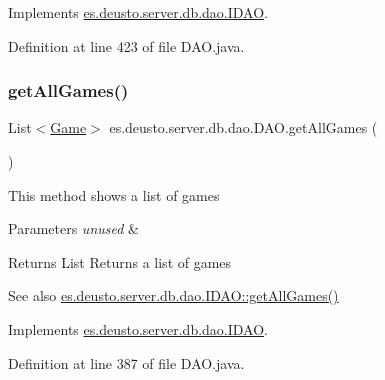 Implements \hyperlink{interfacees_1_1deusto_1_1server_1_1db_1_1dao_1_1_i_d_a_o_ad83c37658f356cb69c1fa70f99416579}{es.\+deusto.\+server.\+db.\+dao.\+I\+D\+AO}.



Definition at line 423 of file D\+A\+O.\+java.

\mbox{\label{classes_1_1deusto_1_1server_1_1db_1_1dao_1_1_d_a_o_af49ed57bdac4dec48ab7616602d12df2}} 
\subsubsection{\texorpdfstring{get\+All\+Games()}{getAllGames()}}
{\footnotesize\ttfamily List$<$\hyperlink{classes_1_1deusto_1_1server_1_1db_1_1data_1_1_game}{Game}$>$ es.\+deusto.\+server.\+db.\+dao.\+D\+A\+O.\+get\+All\+Games (\begin{DoxyParamCaption}{ }\end{DoxyParamCaption})}

This method shows a list of games 
\begin{DoxyParams}{Parameters}
{\em unused} & \\
\hline
\end{DoxyParams}
\begin{DoxyReturn}{Returns}
List Returns a list of games 
\end{DoxyReturn}
\begin{DoxySeeAlso}{See also}
\hyperlink{interfacees_1_1deusto_1_1server_1_1db_1_1dao_1_1_i_d_a_o_aebafef372cf3064b12d16fcb651b41ff}{es.\+deusto.\+server.\+db.\+dao.\+I\+D\+A\+O\+::get\+All\+Games()} 
\end{DoxySeeAlso}


Implements \hyperlink{interfacees_1_1deusto_1_1server_1_1db_1_1dao_1_1_i_d_a_o_aebafef372cf3064b12d16fcb651b41ff}{es.\+deusto.\+server.\+db.\+dao.\+I\+D\+AO}.



Definition at line 387 of file D\+A\+O.\+java.

\mbox{\label{classes_1_1deusto_1_1server_1_1db_1_1dao_1_1_d_a_o_ac1cb7032ef21f53dead8347ef440f431}} 
